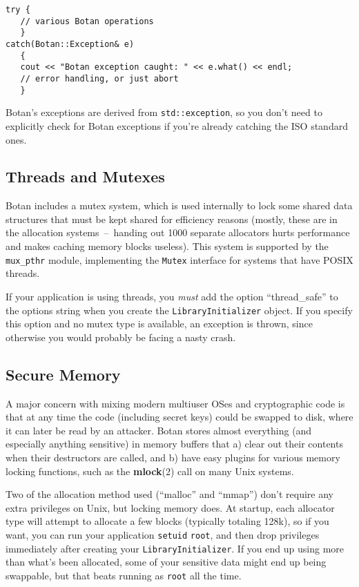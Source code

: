 \documentclass{article}
\newcommand{\function}[1]{\textbf{#1}}
\newcommand{\type}[1]{\texttt{#1}}
\begin{document}
\begin{verbatim}
try {
   // various Botan operations
   }
catch(Botan::Exception& e)
   {
   cout << "Botan exception caught: " << e.what() << endl;
   // error handling, or just abort
   }
\end{verbatim}

Botan's exceptions are derived from \type{std::exception}, so you don't need
to explicitly check for Botan exceptions if you're already catching the ISO
standard ones.

\subsection{Threads and Mutexes}

Botan includes a mutex system, which is used internally to lock some shared
data structures that must be kept shared for efficiency reasons (mostly, these
are in the allocation systems~--~handing out 1000 separate allocators hurts
performance and makes caching memory blocks useless). This system is supported
by the \texttt{mux\_pthr} module, implementing the \type{Mutex} interface for
systems that have POSIX threads.

If your application is using threads, you \emph{must} add the option
``thread\_safe'' to the options string when you create the
\type{LibraryInitializer} object. If you specify this option and no mutex type
is available, an exception is thrown, since otherwise you would probably be
facing a nasty crash.

\subsection{Secure Memory}

A major concern with mixing modern multiuser OSes and cryptographic
code is that at any time the code (including secret keys) could be
swapped to disk, where it can later be read by an attacker. Botan
stores almost everything (and especially anything sensitive) in memory
buffers that a) clear out their contents when their destructors are
called, and b) have easy plugins for various memory locking functions,
such as the \function{mlock}(2) call on many Unix systems.

Two of the allocation method used (``malloc'' and ``mmap'') don't
require any extra privileges on Unix, but locking memory does. At
startup, each allocator type will attempt to allocate a few blocks
(typically totaling 128k), so if you want, you can run your
application \texttt{setuid} \texttt{root}, and then drop privileges
immediately after creating your \type{LibraryInitializer}. If you end
up using more than what's been allocated, some of your sensitive data
might end up being swappable, but that beats running as \texttt{root}
all the time.
\end{document}
